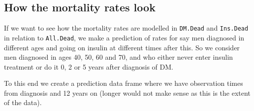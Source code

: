 \documentclass[a4paper,twoside,12pt]{report}
\begin{document}
\subsection{How the mortality rates look}

If we want to see how the mortality rates are modelled in
\texttt{DM.Dead} and \texttt{Ins.Dead} in relation to
\texttt{All.Dead}, we make a prediction of rates for say men diagnosed
in different ages and going on insulin at different times after
this. So we consider men diagnosed in ages 40, 50, 60 and 70, and who
either never enter insulin treatment or do it 0, 2 or 5 years after
diagnosis of DM.

To this end we create a prediction data frame where we have
observation times from diagnosis and 12 years on (longer would not
make sense as this is the extent of the data).
\end{document}
